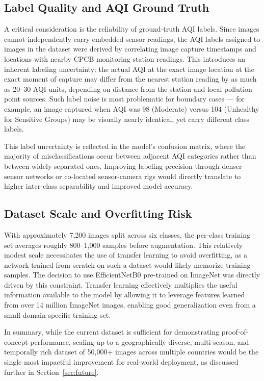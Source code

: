 \documentclass[conference]{IEEEtran}
\begin{document}
\subsection{Label Quality and AQI Ground Truth}

A critical consideration is the reliability of ground-truth AQI labels.
Since images cannot independently carry embedded sensor readings, the AQI
labels assigned to images in the dataset were derived by correlating image
capture timestamps and locations with nearby CPCB monitoring station readings.
This introduces an inherent labeling uncertainty: the actual AQI at the
exact image location at the exact moment of capture may differ from the
nearest station reading by as much as 20--30 AQI units, depending on
distance from the station and local pollution point sources. Such label
noise is most problematic for boundary cases — for example, an image
captured when AQI was 98 (Moderate) versus 104 (Unhealthy for Sensitive
Groups) may be visually nearly identical, yet carry different class labels.

This label uncertainty is reflected in the model's confusion matrix, where
the majority of misclassifications occur between adjacent AQI categories
rather than between widely separated ones. Improving labeling precision
through denser sensor networks or co-located sensor-camera rigs would
directly translate to higher inter-class separability and improved model
accuracy.

\subsection{Dataset Scale and Overfitting Risk}

With approximately 7{,}200 images split across six classes, the per-class
training set averages roughly 800--1{,}000 samples before augmentation.
This relatively modest scale necessitates the use of transfer learning to
avoid overfitting, as a network trained from scratch on such a dataset
would likely memorize training samples. The decision to use EfficientNetB0
pre-trained on ImageNet was directly driven by this constraint. Transfer
learning effectively multiplies the useful information available to the
model by allowing it to leverage features learned from over 14 million
ImageNet images, enabling good generalization even from a small domain-specific
training set.

In summary, while the current dataset is sufficient for demonstrating
proof-of-concept performance, scaling up to a geographically diverse,
multi-season, and temporally rich dataset of 50{,}000+ images across multiple
countries would be the single most impactful improvement for real-world
deployment, as discussed further in Section~\ref{sec:future}.
\end{document}
